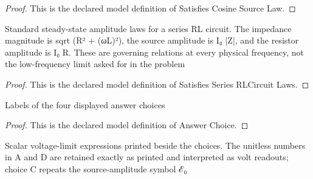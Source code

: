 \begin{proof}
  This is the declared model definition of Satisfies Cosine Source Law.
\end{proof}
\begin{definition}
  \label{def:physics:phyx-mini-0888:phyxminiproblems-problemphyxmini0888-satisfiesseriesrlcircuitlaws}
  Standard steady-state amplitude laws for a series RL circuit. The impedance magnitude is sqrt (R² + (ωL)²), the source amplitude is I₀ |Z|, and the resistor amplitude is I₀ R. These are governing relations at every physical frequency, not the low-frequency limit asked for in the problem
\end{definition}
\begin{proof}
  This is the declared model definition of Satisfies Series RLCircuit Laws.
\end{proof}
\begin{definition}
  \label{def:physics:phyx-mini-0888:phyxminiproblems-problemphyxmini0888-answerchoice}
  Labels of the four displayed answer choices
\end{definition}
\begin{proof}
  This is the declared model definition of Answer Choice.
\end{proof}
\begin{definition}
  \label{def:physics:phyx-mini-0888:phyxminiproblems-problemphyxmini0888-answerchoice-displayedlimitinvolts}
  Scalar voltage-limit expressions printed beside the choices. The unitless numbers in A and D are retained exactly as printed and interpreted as volt readouts; choice C repeats the source-amplitude symbol ℰ₀
\end{definition}
